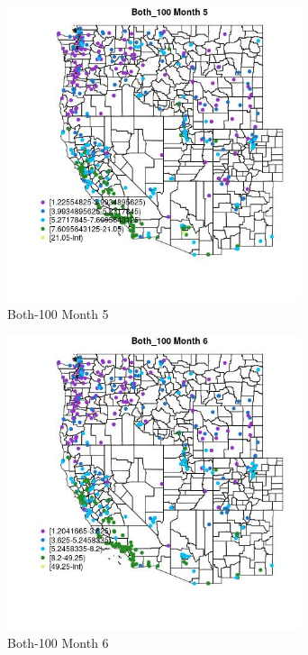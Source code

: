 \begin{figure} 
\centering  
\includegraphics[width=0.77\textwidth]{Code_Outputs/ML_input_report_ML_input_PM25_Step5_part_d_de_duplicated_aves_ML_input_MapObsMo5Both_100.jpg} 
\caption{\label{fig:ML_input_report_ML_input_PM25_Step5_part_d_de_duplicated_aves_ML_inputMapObsMo5Both_100}Both-100 Month 5} 
\end{figure} 
 

\begin{figure} 
\centering  
\includegraphics[width=0.77\textwidth]{Code_Outputs/ML_input_report_ML_input_PM25_Step5_part_d_de_duplicated_aves_ML_input_MapObsMo6Both_100.jpg} 
\caption{\label{fig:ML_input_report_ML_input_PM25_Step5_part_d_de_duplicated_aves_ML_inputMapObsMo6Both_100}Both-100 Month 6} 
\end{figure} 
 

